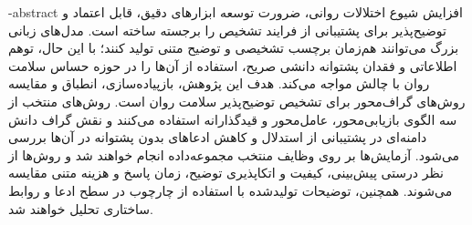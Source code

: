 
\fa-abstract{
افزایش شیوع اختلالات روانی، ضرورت توسعه ابزارهای دقیق، قابل اعتماد و توضیح‌پذیر برای پشتیبانی از فرایند تشخیص را برجسته ساخته است. مدل‌های زبانی بزرگ می‌توانند هم‌زمان برچسب تشخیصی و توضیح متنی تولید کنند؛ با این حال، توهم اطلاعاتی و فقدان پشتوانه دانشی صریح، استفاده از آن‌ها را در حوزه حساس سلامت روان با چالش مواجه می‌کند. هدف این پژوهش، بازپیاده‌سازی، انطباق و مقایسه روش‌های گراف‌محور برای تشخیص توضیح‌پذیر سلامت روان است. روش‌های منتخب از سه الگوی بازیابی‌محور، عامل‌محور و قیدگذارانه استفاده می‌کنند و نقش گراف دانش دامنه‌ای در پشتیبانی از استدلال و کاهش ادعاهای بدون پشتوانه در آن‌ها بررسی می‌شود. آزمایش‌ها بر روی وظایف منتخب مجموعه‌داده  انجام خواهند شد و روش‌ها از نظر درستی پیش‌بینی، کیفیت و اتکاپذیری توضیح، زمان پاسخ و هزینه متنی مقایسه می‌شوند. همچنین، توضیحات تولیدشده با استفاده از چارچوب  در سطح ادعا و روابط ساختاری تحلیل خواهند شد.
}






